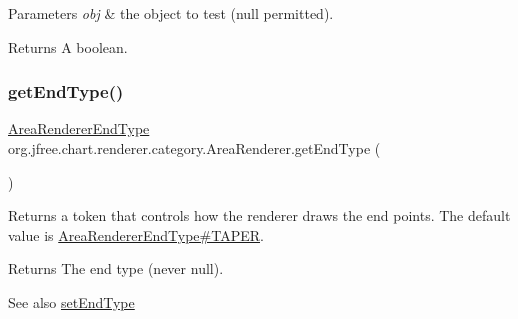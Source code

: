 \begin{DoxyParams}{Parameters}
{\em obj} & the object to test ({\ttfamily null} permitted).\\
\hline
\end{DoxyParams}
\begin{DoxyReturn}{Returns}
A boolean. 
\end{DoxyReturn}
\mbox{\label{classorg_1_1jfree_1_1chart_1_1renderer_1_1category_1_1_area_renderer_ab2696ac02805a7c75d191a5731d821fe}} 
\subsubsection{\texorpdfstring{get\+End\+Type()}{getEndType()}}
{\footnotesize\ttfamily \mbox{\hyperlink{classorg_1_1jfree_1_1chart_1_1renderer_1_1_area_renderer_end_type}{Area\+Renderer\+End\+Type}} org.\+jfree.\+chart.\+renderer.\+category.\+Area\+Renderer.\+get\+End\+Type (\begin{DoxyParamCaption}{ }\end{DoxyParamCaption})}

Returns a token that controls how the renderer draws the end points. The default value is \mbox{\hyperlink{classorg_1_1jfree_1_1chart_1_1renderer_1_1_area_renderer_end_type_afb3c302717f61bb7ac019ac445d76692}{Area\+Renderer\+End\+Type\#\+T\+A\+P\+ER}}.

\begin{DoxyReturn}{Returns}
The end type (never {\ttfamily null}).
\end{DoxyReturn}
\begin{DoxySeeAlso}{See also}
\mbox{\hyperlink{classorg_1_1jfree_1_1chart_1_1renderer_1_1category_1_1_area_renderer_ac5e2ecaa5a1cf0d8a49f1915b97dbe39}{set\+End\+Type}} 
\end{DoxySeeAlso}
\mbox{\label{classorg_1_1jfree_1_1chart_1_1renderer_1_1category_1_1_area_renderer_ac0e7bac40efae55815f961d1074b6873}} 
